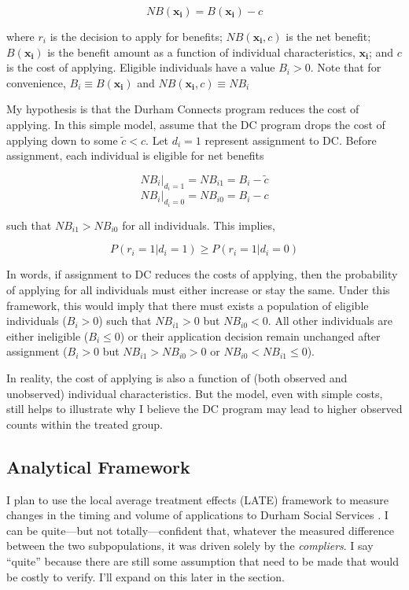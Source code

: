 \documentclass[12pt,letterpaperpaper,]{book}
\begin{document}
\[
  NB(\bm{x_i}) = B(\bm{x_i}) - c
\]

where \(r_i\) is the decision to apply for benefits; \(NB(\bm{x_i}, c)\)
is the net benefit; \(B(\bm{x_i})\) is the benefit amount as a function
of individual characteristics, \(\bm{x_i}\); and \(c\) is the cost of
applying. Eligible individuals have a value \(B_i > 0\). Note that for
convenience, \(B_i \equiv B(\bm{x_i})\) and
\(NB(\bm{x_i}, c) \equiv NB_i\)

My hypothesis is that the Durham Connects program reduces the cost of
applying. In this simple model, assume that the DC program drops the
cost of applying down to some \(\tilde c < c\). Let \(d_i = 1\)
represent assignment to DC. Before assignment, each individual is
eligible for net benefits

\[NB_i|_{d_i=1} = NB_{i1} = B_i - \tilde c\]
\[NB_i|_{d_i=0} = NB_{i0} = B_i - c\]

such that \(NB_{i1} > NB_{i0}\) for all individuals. This implies,

\[P(r_i = 1|d_i = 1) \ge P(r_i=1|d_i = 0)\]

In words, if assignment to DC reduces the costs of applying, then the
probability of applying for all individuals must either increase or stay
the same. Under this framework, this would imply that there must exists
a population of eligible individuals (\(B_i > 0\)) such that
\(NB_{i1} > 0\) but \(NB_{i0} < 0\). All other individuals are either
ineligible (\(B_i \le 0\)) or their application decision remain
unchanged after assignment (\(B_i > 0\) but \(NB_{i1} > NB_{i0} > 0\) or
\(NB_{i0} < NB_{i1} \le 0\)).

In reality, the cost of applying is also a function of (both observed
and unobserved) individual characteristics. But the model, even with
simple costs, still helps to illustrate why I believe the DC program may
lead to higher observed counts within the treated group.

\subsection*{Analytical Framework}\label{analytical-framework}

I plan to use the local average treatment effects (LATE) framework to
measure changes in the timing and volume of applications to Durham
Social Services \citep{angrist_mostly_2008}. I can be quite---but not
totally---confident that, whatever the measured difference between the
two subpopulations, it was driven solely by the \emph{compliers}. I say
``quite'' because there are still some assumption that need to be made
that would be costly to verify. I'll expand on this later in the
section.
\end{document}

